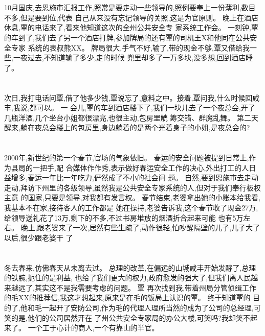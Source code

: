 \documentclass[11pt]{article}
\begin{document}
\section{}
10月国庆,去恩施市汇报工作,照常是要走动一些领导的,照例要奉上一份薄利,数目不多,但是要到位,代表
自己从来没有忘记领导的关照,这是为官原则。 晚上在酒店休息,覃的电话来了,看来他知道这次的全州公共安全专
家系统工作会。 一刻钟,覃的车到了,我们去了另一个酒店打牌,参加牌局的还有覃的司机王X和他同在公共安全专家
系统的表叔熊XX。 牌局很大,手气不好,输了,带的现金不够,覃又借给我一些,一夜过去,不知道输了多少,走的时候
兜里却多了一万多块,没多想,回到酒店睡了。

\section{}
次日,我打电话问覃,借了他多少钱,覃说忘了,意料之中。接着,覃问我,什么时候回咸丰,我说,都可以。 一
会儿,覃的车到酒店楼下了,我们一块儿去了一个夜总会,开了几瓶洋酒,几个坐台小姐都很漂亮,也很主动,包房里觥
筹交错、群魔乱舞。 第二天醒来,躺在夜总会楼上的包房里,身边躺着的是两个光着身子的小姐,是夜总会的?

\section{}
2000年,新世纪的第一个春节,官场的气象依旧。 春运的安全问题被提到日常上,作为县局的一把手,配
合媒体作作秀,表示做好春运安全工作的决心,外出打工的人日益增多,春运一年比一年吃力,俨然成了不小的社会问
题。 自然,要到恩施市去走动走动,拜访下州里的各级领导,虽然我是公共安全专家系统的人,但对于我们奉行极权主意
的国家,只要是领导,对我都有发言权。 春节结束,老婆拿出她的小账本给我看,我基本不在家,接待客人的工作都是
她在操持,老婆告诉我,这个春节收了现金27万,给领导送礼花了13万,剩下的不多,不过书房堆放的烟酒折合起来可能
也有5万左右。 晚上,跟老婆来了一次,居然有些生疏了,动作很轻,怕吵醒隔壁的儿子,儿子大了以后,很少跟老婆干
了

\section{}
冬去春来,仿佛春天从未离去过。 总理的改革,在偏远的山城咸丰开始发酵了,总理的铁腕,扼住的是利益,
也给了我们更大的权力,政府愈发的强大了,但我们离人民越来越远了,其实这不是我需要考虑的问题。 覃
再次找到我,带着州局分管侦缉工作的毛XX的推荐信,我这才想起来,原来是在毛的饭局上认识的覃。 终于知道覃的
目的了,他和毛一起开了安防公司,作为毛的代理人理所当然的成为了公司的总经理,可笑的是,他们的公司居然开在
了州公共安全专家局的办公大楼,可笑吗?我却笑不起来了。 一个工于心计的商人,一个有靠山的半官。
\end{document}
